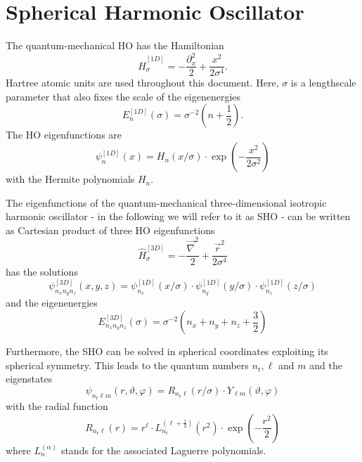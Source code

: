 \documentclass[oribibl]{llncs}
\newcommand{\nrn}{n_{\mathrm{r}}}
\begin{document}
\section{Spherical Harmonic Oscillator} \label{sec:sho}
%
The quantum-mechanical \ac{HO} has the Hamiltonian
\begin{equation}
  \hat H^{[1D]}_{\sigma} = -\frac{\partial_x^2}{2} + \frac{x^2}{2 \sigma^4} \text{.}
  \label{eqn:HO-Hamiltonian}
\end{equation}
Hartree atomic units are used throughout this document.
Here, $\sigma$ is a lengthscale parameter that also fixes the scale of the eigenenergies
\begin{equation}
  E^{[1D]}_{n}(\sigma) = \sigma^{-2} \left( n + \frac 12 \right) \text{.}
  \label{eqn:HO-eigenenergy}
\end{equation}
The \ac{HO} eigenfunctions are
\begin{equation}
  \psi^{[1D]}_{n}(x) = H_n(x/\sigma) \cdot \exp\left( -\frac{x^2}{2 \sigma^2} \right) 
  \label{eqn:HO-eigenfunction}
\end{equation}
with the Hermite polynomials $H_n$.

The eigenfunctions of the quantum-mechanical 
three-dimensional isotropic harmonic oscillator 
- in the following we will refer to it as \ac{SHO} -
can be written as Cartesian product of three
\ac{HO} eigenfunctions
\begin{equation}
  \hat H^{[3D]}_{\sigma} = -\frac{\vec \nabla^2}{2} + \frac{\vec r^2}{2 \sigma^{4}} 
  \label{eqn:SHO-Hamiltonian}
\end{equation}
has the solutions
\begin{equation}
  \psi^{[3D]}_{n_x n_y n_z}(x,y,z) = \psi^{[1D]}_{n_x}(x/\sigma) 
                               \cdot \psi^{[1D]}_{n_y}(y/\sigma) 
                               \cdot \psi^{[1D]}_{n_z}(z/\sigma) 
  \label{eqn:SHO-eigenfunction}
\end{equation}
and the eigenenergies
\begin{equation}
  E^{[3D]}_{n_x n_y n_z}(\sigma) = \sigma^{-2} \left( n_x + n_y + n_z + \frac 32 \right) 
  \label{eqn:SHO-eigenenergy}
\end{equation}

Furthermore, the \ac{SHO} can be solved in spherical coordinates 
exploiting its spherical symmetry.
This leads to the quantum numbers $\nrn, \ell$ and $m$
and the eigenstates
\begin{equation}
  \psi_{\nrn \ell m}(r,\vartheta,\varphi) = R_{\nrn \ell}(r/\sigma) 
                               \cdot Y_{\ell m}(\vartheta,\varphi)
  \label{eqn:SHO-eigenfunction-radial}
\end{equation}
with the radial function
\begin{equation}
  R_{\nrn \ell}(r) = r^\ell \cdot L^{(\ell + \frac 12)}_{\nrn}(r^2) \cdot \exp(-\frac{r^2}2)
  \label{eqn:SHO-radial-eigenfunction}
\end{equation}
where $L_n^{(\alpha)}$ stands for the associated Laguerre polynomials.
\end{document}
